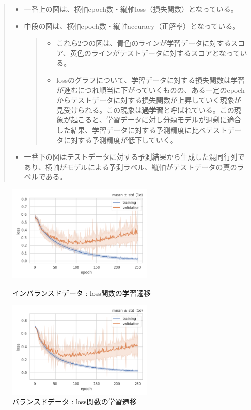 \documentclass[a4j, 11pt]{jreport}
\begin{document}
\begin{quote}
	\begin{itemize}
	 \item 一番上の図は、横軸epoch数・縦軸loss（損失関数）となっている。
	 \item 中段の図は、横軸epoch数・縦軸accuracy（正解率）となっている。
	 \begin{quote}
		\begin{itemize}
		 \item これら2つの図は、青色のラインが学習データに対するスコア、黄色のラインがテストデータに対するスコアとなっている。
		 \item lossのグラフについて、学習データに対する損失関数は学習が進むにつれ順当に下がっていくものの、ある一定のepochからテストデータに対する損失関数が上昇していく現象が見受けられる。この現象は\textbf{過学習}と呼ばれている。この現象が起こると、学習データに対し分類モデルが過剰に適合した結果、学習データに対する予測精度に比べテストデータに対する予測精度が低下していく。
		\end{itemize}
	 \end{quote}
	 \item 一番下の図はテストデータに対する予測結果から生成した混同行列であり、横軸がモデルによる予測ラベル、縦軸がテストデータの真のラベルである。
	\end{itemize}
 \end{quote}

\begin{figure}[htbp]
  \begin{minipage}[b]{0.45\hsize}
    \centering
    \includegraphics[keepaspectratio, width=7cm]{images/losses_ex4-2.png}
    \caption{インバランスドデータ : loss関数の学習遷移}
		\label{fig:losses_ex4-2-2}
  \end{minipage}
  \begin{minipage}[b]{0.45\hsize}
    \centering
    \includegraphics[keepaspectratio, width=7cm]{images/losses_ex4-3.png}
    \caption{バランスドデータ : loss関数の学習遷移}
		\label{fig:losses_ex4-3}
  \end{minipage}
\end{figure}
\end{document}
